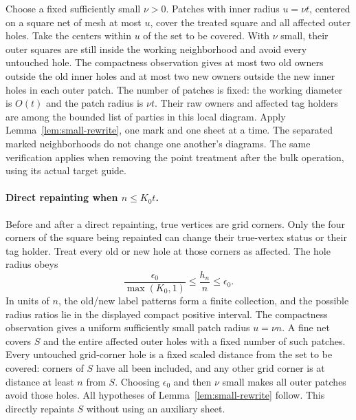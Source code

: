\documentclass[11pt]{article}
\numberwithin{equation}{section}
\theoremstyle{definition}
\theoremstyle{remark}
\begin{document}
Choose a fixed sufficiently small $\nu>0$.  Patches with inner radius
$u=\nu t$, centered on a square net of mesh at most $u$, cover the
treated square and all affected outer holes.  Take the centers within
$u$ of the set to be covered.  With $\nu$ small, their outer squares
are still inside the working neighborhood and avoid every untouched
hole.  The compactness observation gives at most two old owners
outside the old inner holes and at most two new owners outside the
new inner holes in each outer patch.  The number of patches is fixed:
the working diameter is $O(t)$ and the patch radius is $\nu t$.
Their raw owners and affected tag holders are among the bounded list
of parties in this local diagram.  Apply
Lemma~\ref{lem:small-rewrite}, one mark and one sheet at a time.
The separated marked neighborhoods do not change one another's
diagrams.  The same verification applies when removing the point
treatment after the bulk operation, using its actual target guide.

\paragraph{Direct repainting when $n\le K_0t$.}
Before and after a direct repainting, true vertices are grid corners.
Only the four corners of the square being repainted can change their
true-vertex status or their tag holder.  Treat every old or new hole
at those corners as affected.  The hole radius obeys
\begin{equation}
 \frac{\epsilon_0}{\max(K_0,1)}
 \le \frac{h_n}{n}\le\epsilon_0.
 \label{eq:geometry-small-radius}
\end{equation}
In units of $n$, the old/new label patterns form a finite collection,
and the possible radius ratios lie in the displayed compact positive
interval.  The compactness observation gives a uniform sufficiently
small patch radius $u=\nu n$.  A fine net covers $S$ and the entire
affected outer holes with a fixed number of such patches.  Every
untouched grid-corner hole is a fixed scaled distance from the set to
be covered: corners of $S$ have all been included, and any other grid
corner is at distance at least $n$ from $S$.  Choosing $\epsilon_0$
and then $\nu$ small makes all outer patches avoid those holes.  All
hypotheses of Lemma~\ref{lem:small-rewrite} follow.  This
directly repaints $S$ without using an auxiliary sheet.
\end{document}
